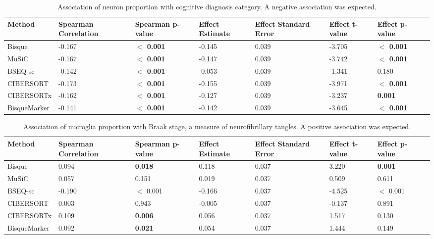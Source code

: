 \begin{table}[!ht]
    \scriptsize
    \centering
    \begin{tabularx}{\textwidth}{|L|L|L|L|L|L|L|X|}
    \hline
    \textbf{Method} & \textbf{Spearman Correlation} & \textbf{Spearman p-value} & \textbf{Effect Estimate} & \textbf{Effect Standard Error} & \textbf{Effect t-value} & \textbf{Effect p-value}   \\ \hline
    Bisque & -0.167 & \textbf{$\mathbf{<}$ 0.001} & -0.145 & 0.039 & -3.705 &  \textbf{$\mathbf{<}$ 0.001}  \\ \hline
    MuSiC & -0.167 & \textbf{$\mathbf{<}$ 0.001} & -0.147 & 0.039 & -3.742 &  \textbf{$\mathbf{<}$ 0.001}  \\ \hline
    BSEQ-sc & -0.142 & \textbf{$\mathbf{<}$ 0.001} & -0.053 & 0.039 & -1.341 & 0.180  \\ \hline
    CIBERSORT & -0.173 & \textbf{$\mathbf{<}$ 0.001} & -0.155 & 0.039 & -3.971 & \textbf{$\mathbf{<}$ 0.001} \\ \hline
    CIBERSORTx & -0.162 & \textbf{$\mathbf{<}$ 0.001} & -0.127 & 0.039 & -3.237 & \textbf{0.001} \\ \hline
    BisqueMarker & -0.141 & \textbf{$\mathbf{<}$ 0.001} & -0.142 & 0.039 & -3.645 & \textbf{$\mathbf{<}$ 0.001}  \\ \hline    
    \end{tabularx}
    \caption{Association of neuron proportion with cognitive diagnosis category. A negative association was expected.}
    \label{table:suptable2.2a}
\end{table}
\begin{table}
    \scriptsize
    \centering
    \begin{tabularx}{\textwidth}{|L|L|L|L|L|L|L|X|}
    \hline
    \textbf{Method} & \textbf{Spearman Correlation} & \textbf{Spearman p-value} & \textbf{Effect Estimate} & \textbf{Effect Standard Error} & \textbf{Effect t-value} & \textbf{Effect p-value}   \\ \hline
    Bisque & 0.094 & \textbf{0.018} & 0.118 & 0.037 & 3.220 &  \textbf{0.001}  \\ \hline
    MuSiC & 0.057 & 0.151 & 0.019 & 0.037 & 0.509 & 0.611  \\ \hline
    BSEQ-sc & -0.190 & $<$ 0.001 & -0.166 & 0.037 & -4.525 & $<$ 0.001  \\ \hline
    CIBERSORT & 0.003 & 0.943 & -0.005 & 0.037 & -0.137 & 0.891 \\ \hline
    CIBERSORTx & 0.109 & \textbf{0.006} & 0.056 & 0.037 & 1.517 & 0.130 \\ \hline
    BisqueMarker & 0.092 & \textbf{0.021} & 0.054 & 0.037 & 1.444 & 0.149  \\ \hline    
    \end{tabularx}
    \caption{Association of microglia proportion with Braak stage, a measure of neurofibrillary tangles. A positive association was expected.}
    \label{table:suptable2.2b}
\end{table}

